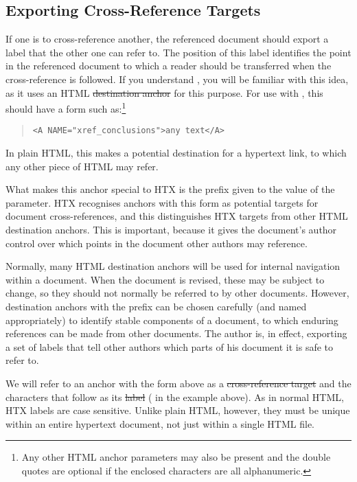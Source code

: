 \subsection{\label{sect:targetlabels}Exporting Cross-Reference Targets}

If one  is to cross-reference another, the referenced
document should export a label that the other one can refer to. The
position of this label identifies the point in the referenced document
to which a reader should be transferred when the cross-reference is
followed.  If you understand , you will be familiar with
this idea, as it uses an HTML \st{destination anchor} for this
purpose. For use with , this should have a form such
as:\footnote{Any other HTML anchor parameters may also be present and
the double quotes are optional if the enclosed characters are all
alphanumeric.}

\begin{quote}
\begin{verbatim}
<A NAME="xref_conclusions">any text</A>
\end{verbatim}
\end{quote}

In plain HTML, this makes  a potential destination for a
hypertext link, to which any other piece of HTML may refer.

What makes this anchor special to HTX is the
 prefix given to the value of
the  parameter. HTX recognises anchors with this form as
potential targets for document cross-references, and this
distinguishes HTX targets from other HTML destination anchors. This is
important, because it gives the document's author control over which
points in the document other authors may reference.

Normally, many HTML destination anchors will be used for internal
navigation within a document. When the document is revised, these may
be subject to change, so they should not normally be referred to by
other documents. However, destination anchors with the
 prefix can be chosen carefully (and
named appropriately) to identify stable components of a document, to
which enduring references can be made from other documents. The author
is, in effect, exporting a set of labels that tell other authors which
parts of his document it is safe to refer to.

We will refer to an anchor with the form above as a
\st{cross-reference target} and the characters that follow 
as its \st{label} ( in the example above). As in
normal HTML, HTX labels are case sensitive. Unlike plain HTML,
however, they must be unique within an entire hypertext document, not
just within a single HTML file.

